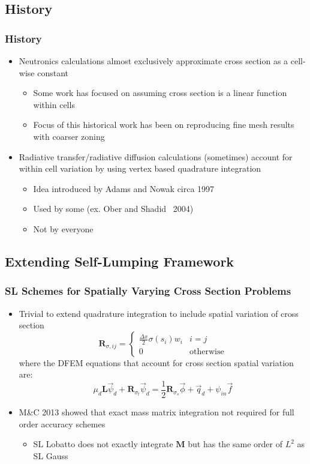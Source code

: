 \documentclass{beamer}
\newcommand{\be}{\begin{equation*}}   %
\newcommand{\ee}{\end{equation*}}
\newcommand{\R}{\ensuremath{ \mathbf{R} }}
\begin{document}
\subsection{History}
\begin{frame}
\frametitle{History}
\begin{itemize}
\item Neutronics calculations almost exclusively approximate cross section as a cell-wise constant
\begin{itemize}
\item Some work has focused on assuming cross section is a linear function within cells
\item Focus of this historical work has been on reproducing fine mesh results with coarser zoning
\end{itemize}
\item Radiative transfer/radiative diffusion calculations (sometimes) account for within cell variation by using vertex based quadrature integration
\begin{itemize}
\item Idea introduced by Adams and Nowak circa 1997
\item Used by some (ex. Ober and Shadid ~2004)
\item Not by everyone
\end{itemize}
\end{itemize}
\end{frame}

\subsection{Extending Self-Lumping Framework}

\begin{frame}
\frametitle{SL Schemes for Spatially Varying Cross Section Problems}
\begin{itemize}
\item Trivial to extend quadrature integration to include spatial variation of cross section
\be
\mathbf{R}_{\sigma,ij}= \left \{ \begin{array}{ll}  \frac{\Delta x }{2}\sigma(s_i) w_i  & i=j \\ 0 & \text{otherwise} \end{array} \right.
\ee
where the DFEM equations that account for cross section spatial variation are:
\be
\mu_d \mathbf{L}\vec{\psi}_d + \R_{\sigma_t} \vec{\psi}_d = \frac{1}{2} \R_{\sigma_s} \vec{\phi} + \vec{q}_d + \psi_{in} \vec{f}
\ee
\item M\&C 2013 showed that exact mass matrix integration not required for full order accuracy schemes
\begin{itemize}
\item SL Lobatto does not exactly integrate $\mathbf{M}$ but has the same order of $L^2$ as SL Gauss
\end{itemize}
\end{itemize}
\end{frame}
\end{document}
